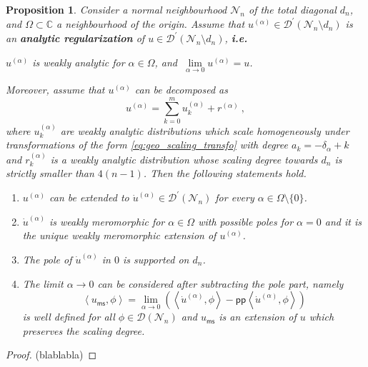 \documentclass[12pt]{book}
\newcommand{\pp}{\mathsf{pp}}
\newcommand{\ms}{\mathsf{ms}}
\newcommand{\sm}[1]{\left\langle#1\right\rangle}
\newcommand{\Dcal}{\mathcal{D}}
\newcommand{\Ncal}{\mathcal{N}}
\newcommand{\Cbb}{\mathbb{C}}
\theoremstyle{break}
\newtheorem{proposition}{Proposition}
\begin{document}
\begin{proposition}\label{prop:regularization}
Consider a normal neighbourhood $\Ncal_n$ of the total diagonal $d_n$, and $\Omega \subset \Cbb$ a neighbourhood of the origin. Assume that $u^{(\alpha)}\in\Dcal^\prime(\Ncal_n\setminus d_n)$ is an \textbf{analytic regularization} of $u\in\Dcal^\prime(\Ncal_n\setminus d_n)$, \textbf{i.e.}
%
\begin{center}
$u^{(\alpha)}$ is weakly analytic for $\alpha \in \Omega$, and $\ \underset{\alpha\to 0}{\lim} u^{(\alpha)} = u$.
\end{center}
%
Moreover, assume that $u^{(\alpha)}$ can be decomposed as 
%
\begin{equation*}
u^{(\alpha)} = \sum_{k=0}^m u^{(\alpha)}_k + r^{(\alpha)} \ ,
\end{equation*}
%
where $u^{(\alpha)}_k$ are weakly analytic distributions which scale homogeneously under transformations of the form \eqref{eq:geo_scaling_transfo} with degree $a_k = -\delta_\alpha + k$ and $r^{(\alpha)}_k$ is a weakly analytic distribution whose scaling degree towards $d_n$ is strictly smaller than $4(n-1)$. Then the following statements hold.
%
\begin{enumerate}
\item $u^{(\alpha)}$ can be extended to $\dot{u}^{(\alpha)} \in \Dcal^\prime(\Ncal_n)$ for every $\alpha \in \Omega \setminus \{0\}$.
%
\item $\dot{u}^{(\alpha)}$ is weakly meromorphic for $\alpha \in \Omega$ with possible poles for $\alpha=0$ and it is the unique weakly meromorphic extension of $u^{(\alpha)}$.
%
\item The pole of $\dot{u}^{(\alpha)}$ in $0$ is supported on $d_n$.
%
\item The limit $\alpha \to 0$ can be considered after subtracting the pole part, namely
%
\begin{equation*}
\sm{ u_\ms, \phi } = \lim_{\alpha \to 0} \left( \sm{ \dot{u}^{(\alpha)} , \phi } - \pp\sm{ \dot{u}^{(\alpha)} , \phi } \right) 
\end{equation*}
%
is well defined for all $\phi \in \Dcal(\Ncal_n)$ and $u_\ms$ is an extension of $u$ which preserves the scaling degree.
\end{enumerate}
%
\end{proposition}


\begin{proof}
(blablabla)
\end{proof}
\end{document}
